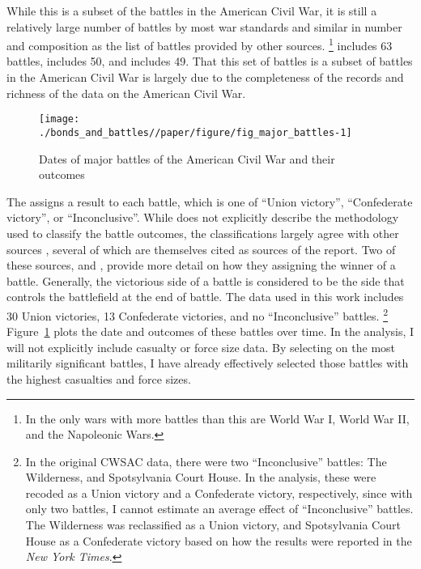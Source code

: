 While this is a subset of the battles in the American Civil War, it is still a relatively large number of battles by most war standards and similar in number and composition as the list of battles provided by other sources.%
\footnote{In \textcite{cdb90} the only wars with more battles than this are World War I, World War II, and the Napoleonic Wars.}
\textcite{Livermore1900} includes 63 battles, \textcite{Bodart1908} includes 50, and \textcite{cdb90} includes 49.
That this set of battles is a subset of battles in the  American Civil War is largely due to the completeness of the records and richness of the data on the American Civil War.

\begin{figure}[!htpb]
  \centering
  \texttt{[image: ./bonds\_and\_battles//paper/figure/fig\_major\_battles-1]}
  \caption{Dates of major battles of the American Civil War and their outcomes}
  \label{bonds:fig:major_battles}
\end{figure}

The \textcite{CWSAC1993b} assigns a result to each battle, which is one of ``Union victory'', ``Confederate victory'', or ``Inconclusive''.
While \textcite{CWSAC1993} does not explicitly describe the methodology used to classify the battle outcomes, the classifications largely agree with other sources \parencites{fox1898regimental}{Livermore1900}{Bodart1908}{cdb90}, several of which are themselves cited as sources of the report.
Two of these sources, \textcite{fox1898regimental} and \textcite{Livermore1900}, provide more detail on how they assigning the winner of a battle.
Generally, the victorious side of a battle is considered to be the side that controls the battlefield at the end of battle.
The data used in this work includes 30 Union victories, 13 Confederate victories, and no ``Inconclusive'' battles.%
\footnote{
  In the original CWSAC data, there were two ``Inconclusive'' battles: The Wilderness, and Spotsylvania Court House.
  In the analysis, these were recoded as a Union victory and a Confederate victory, respectively, since with only two battles, I cannot estimate an average effect of ``Inconclusive'' battles.
  The Wilderness was reclassified as a Union victory, and Spotsylvania Court House as a Confederate victory based on how the results were reported in the \textit{New York Times}.
}
Figure~\ref{bonds:fig:major_battles} plots the date and outcomes of these battles over time.
In the analysis, I will not explicitly include casualty or force size data.
By selecting on the most militarily significant battles, I have already effectively selected those battles with the highest casualties and force sizes.

